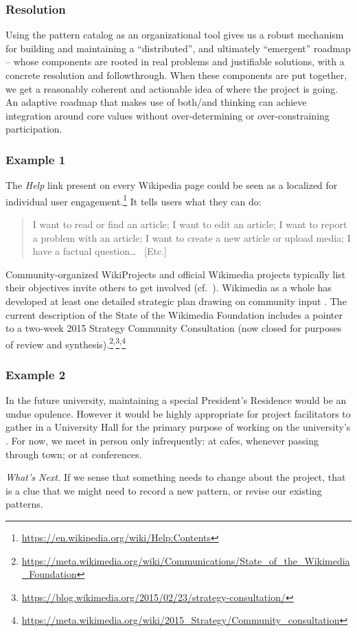 \subsubsection*{Resolution}
Using the pattern catalog as an
organizational tool gives us a robust mechanism for
building and maintaining a ``distributed'', and ultimately
``emergent'' roadmap -- whose components are rooted in real problems
and justifiable solutions, with a concrete resolution and
followthrough.  When these components are put together, we get a
reasonably coherent and actionable idea of where the project is going.
%
An adaptive roadmap that makes use of both/and thinking can achieve
integration around core values without over-determining or
over-constraining participation.

\subsubsection*{Example 1}  The \emph{Help} link present on every Wikipedia page could be seen as a
localized  for individual user
engagement.\footnote{\url{https://en.wikipedia.org/wiki/Help:Contents}}
It tells users what they can do:

\begin{quotation}
\noindent 
I want to read or find an article;
I want to edit an article;
I want to report a problem with an article;
I want to create a new article or upload media;
I have a factual question\ldots
~[Etc.]
\end{quotation}

Community-organized WikiProjects and official Wikimedia projects typically list
their objectives invite others to get involved (cf.~).  Wikimedia as a whole has developed
at least one detailed strategic plan drawing on community input
\cite{wikimedia2011plan}.  The current description of the State of
the Wikimedia Foundation includes a pointer to a two-week 2015
Strategy Community Consultation (now closed for purposes of
review and synthesis).\footnote{\url{https://meta.wikimedia.org/wiki/Communications/State_of_the_Wikimedia_Foundation}}\textsuperscript{,}\footnote{\url{https://blog.wikimedia.org/2015/02/23/strategy-consultation/}}\textsuperscript{,}\footnote{\url{https://meta.wikimedia.org/wiki/2015_Strategy/Community_consultation}}

\subsubsection*{Example 2}
In the future university, maintaining a special President's Residence
would be an undue opulence.  However it would be highly appropriate
for project facilitators to gather in a University Hall for the
primary purpose of working on the university's .
For now, we meet in person only infrequently: at cafes, whenever
passing through town; or at conferences.

\begin{framed}
\noindent
\emph{What's Next.}
If we sense that something needs to change about the project, that is a clue that we might need to record a new pattern, or revise our existing patterns.
\end{framed}
